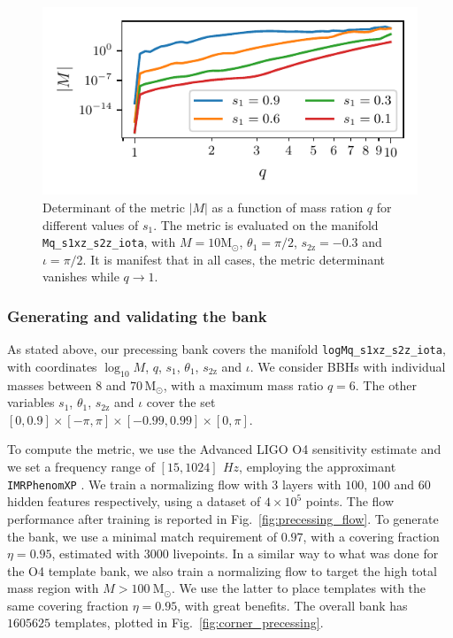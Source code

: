 \documentclass[twocolumn,showpacs,preprintnumbers,nofootinbib,prd,
superscriptaddress,10pt]{revtex4-2}
\begin{document}
\begin{figure}[t]
	\centering
	\includegraphics[scale = 1.]{metric_det_vs_q}
	\caption{Determinant of the metric $|M|$ as a function of mass ration $q$ for different values of $s_1$. The metric is evaluated on the manifold \texttt{Mq\_s1xz\_s2z\_iota}, with $M = 10\mathrm{M_\odot}$, $\theta_1 = \pi/2$, $s_\text{2z} = -0.3$ and $\iota = \pi/2$. It is manifest that in all cases, the metric determinant vanishes while $q \to 1$.}
	\label{fig:metric_vs_q}
\end{figure}

\subsubsection{Generating and validating the bank}

As stated above, our precessing bank covers the manifold \texttt{logMq\_s1xz\_s2z\_iota}, with coordinates $\log_{10}M$, $q$, $s_\text{1}$, $\theta_\text{1}$, $s_\text{2z}$ and $\iota$.
We consider BBHs with individual masses between  $8$ and $70\,\mathrm{M_\odot}$, with a maximum mass ratio $q = 6$.
The other variables $s_\text{1}$, $\theta_\text{1}$, $s_\text{2z}$ and $\iota$ cover the set $[0, 0.9]\times[-\pi, \pi]\times[-0.99, 0.99]\times[0, \pi]$.

To compute the metric, we use the Advanced LIGO O4 sensitivity estimate \cite{O4_PSDs} and we set a frequency range of $[15, 1024] \,\SI{}{Hz}$, employing the approximant \texttt{IMRPhenomXP} \cite{Pratten:2020ceb}.
We train a normalizing flow with $3$ layers with $100$, $100$ and $60$ hidden features respectively, using a dataset of $4\times 10^5$ points.
The flow performance after training is reported in Fig.~\ref{fig:precessing_flow}.
To generate the bank, we use a minimal match requirement of $0.97$, with a covering fraction $\eta = 0.95$, estimated with $3000$ livepoints.
In a similar way to what was done for the O4 template bank, we also train a normalizing flow to target the high total mass region with $M>\SI{100}{\mathrm{M_\odot}}$. We use the latter to place templates with the same covering fraction $\eta = 0.95$, with great benefits.
The overall bank has $1605625$ templates, plotted in Fig.~\ref{fig:corner_precessing}.
\end{document}
